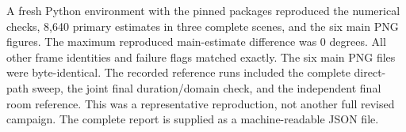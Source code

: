 A fresh Python environment with the pinned packages reproduced the numerical checks, 8,640 primary estimates in three complete scenes, and the six main PNG figures. The maximum reproduced main-estimate difference was 0 degrees. All other frame identities and failure flags matched exactly. The six main PNG files were byte-identical. The recorded reference runs included the complete direct-path sweep, the joint final duration/domain check, and the independent final room reference. This was a representative reproduction, not another full revised campaign. The complete report is supplied as a machine-readable JSON file.
